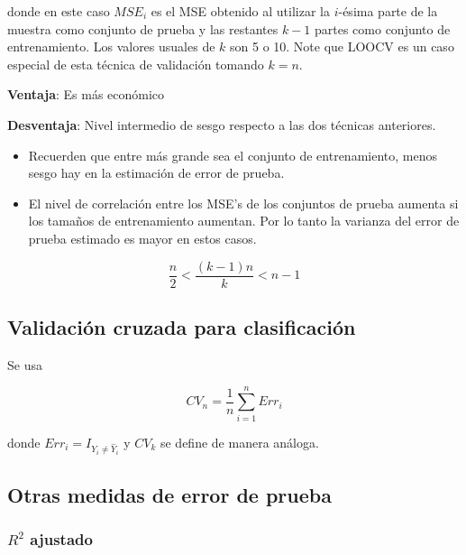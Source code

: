 \documentclass[
  12pt,
]{book}
\providecommand{\tightlist}{%
  \setlength{\itemsep}{0pt}\setlength{\parskip}{0pt}}
\theoremstyle{definition}
\theoremstyle{definition}
\theoremstyle{definition}
\theoremstyle{definition}
\theoremstyle{remark}
\begin{document}
donde en este caso \(MSE_i\) es el MSE obtenido al utilizar la \(i\)-ésima parte de la muestra como conjunto de prueba y las restantes \(k-1\) partes como conjunto de entrenamiento. Los valores usuales de \(k\) son 5 o 10. Note que LOOCV es un caso especial de esta técnica de validación tomando \(k=n\).

\textbf{Ventaja}: Es más económico

\textbf{Desventaja}: Nivel intermedio de sesgo respecto a las dos técnicas anteriores.

\begin{itemize}
\tightlist
\item
  Recuerden que entre más grande sea el conjunto de entrenamiento, menos sesgo hay en la estimación de error de prueba.
\item
  El nivel de correlación entre los MSE's de los conjuntos de prueba aumenta si los tamaños de entrenamiento aumentan. Por lo tanto la varianza del error de prueba estimado es mayor en estos casos.
\end{itemize}

\begin{equation*}
\frac{n}{2} < \frac{(k-1)n}{k} < n-1
\end{equation*}

\hypertarget{validaciuxf3n-cruzada-para-clasificaciuxf3n}{%
\subsection{Validación cruzada para clasificación}\label{validaciuxf3n-cruzada-para-clasificaciuxf3n}}

Se usa

\begin{equation*}
CV_{n} = \frac{1}{n} \sum_{i=1}^{n} Err_{i}
\end{equation*}

donde \(Err_i = I_{Y_i \neq \hat{Y}_{i}}\) y \(CV_{k}\) se define de manera análoga.

\hypertarget{otras-medidas-de-error-de-prueba}{%
\subsection{Otras medidas de error de prueba}\label{otras-medidas-de-error-de-prueba}}

\hypertarget{r2-ajustado-1}{%
\subsubsection{\texorpdfstring{\(R^2\) ajustado}{R\^{}2 ajustado}}\label{r2-ajustado-1}}
\end{document}
